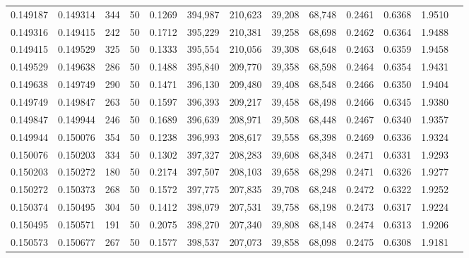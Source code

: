 \begin{tabular}{rrrrrrrrrrrrr}
0.149187 & 0.149314 &   344 &  50 &                                     0.1269 & 394,987 & 210,623 &  39,208 &  68,748 & 0.2461 & 0.6368 & 1.9510 \\
0.149316 & 0.149415 &   242 &  50 &                                     0.1712 & 395,229 & 210,381 &  39,258 &  68,698 & 0.2462 & 0.6364 & 1.9488 \\
0.149415 & 0.149529 &   325 &  50 &                                     0.1333 & 395,554 & 210,056 &  39,308 &  68,648 & 0.2463 & 0.6359 & 1.9458 \\
0.149529 & 0.149638 &   286 &  50 &                                     0.1488 & 395,840 & 209,770 &  39,358 &  68,598 & 0.2464 & 0.6354 & 1.9431 \\
0.149638 & 0.149749 &   290 &  50 &                                     0.1471 & 396,130 & 209,480 &  39,408 &  68,548 & 0.2466 & 0.6350 & 1.9404 \\
0.149749 & 0.149847 &   263 &  50 &                                     0.1597 & 396,393 & 209,217 &  39,458 &  68,498 & 0.2466 & 0.6345 & 1.9380 \\
0.149847 & 0.149944 &   246 &  50 &                                     0.1689 & 396,639 & 208,971 &  39,508 &  68,448 & 0.2467 & 0.6340 & 1.9357 \\
0.149944 & 0.150076 &   354 &  50 &                                     0.1238 & 396,993 & 208,617 &  39,558 &  68,398 & 0.2469 & 0.6336 & 1.9324 \\
0.150076 & 0.150203 &   334 &  50 &                                     0.1302 & 397,327 & 208,283 &  39,608 &  68,348 & 0.2471 & 0.6331 & 1.9293 \\
0.150203 & 0.150272 &   180 &  50 &                                     0.2174 & 397,507 & 208,103 &  39,658 &  68,298 & 0.2471 & 0.6326 & 1.9277 \\
0.150272 & 0.150373 &   268 &  50 &                                     0.1572 & 397,775 & 207,835 &  39,708 &  68,248 & 0.2472 & 0.6322 & 1.9252 \\
0.150374 & 0.150495 &   304 &  50 &                                     0.1412 & 398,079 & 207,531 &  39,758 &  68,198 & 0.2473 & 0.6317 & 1.9224 \\
0.150495 & 0.150571 &   191 &  50 &                                     0.2075 & 398,270 & 207,340 &  39,808 &  68,148 & 0.2474 & 0.6313 & 1.9206 \\
0.150573 & 0.150677 &   267 &  50 &                                     0.1577 & 398,537 & 207,073 &  39,858 &  68,098 & 0.2475 & 0.6308 & 1.9181 \\

\end{tabular}
